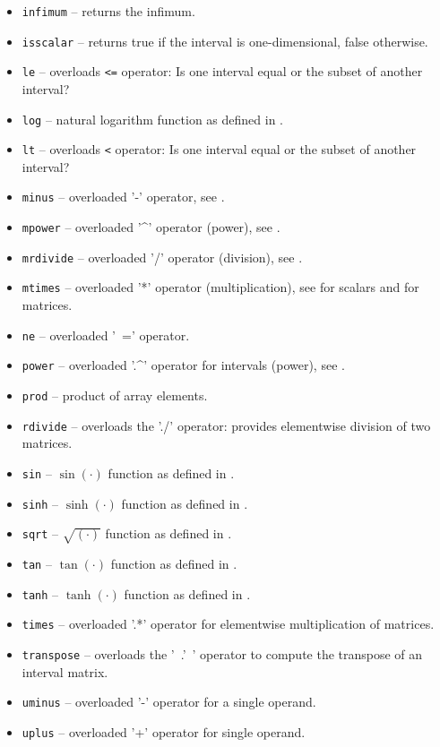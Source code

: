 \begin{itemize}
    \item \texttt{infimum} -- returns the infimum.
    \item \texttt{isscalar} -- returns true if the interval is one-dimensional, false otherwise.
    \item \texttt{le} -- overloads \texttt{<=} operator: Is one interval equal or the subset of another interval?
    \item \texttt{log} -- natural logarithm function as defined in \cite[Eq.~(5)]{Althoff2016a}.
    \item \texttt{lt} -- overloads \texttt{<} operator: Is one interval equal or the subset of another interval?
    \item \texttt{minus} -- overloaded '-' operator, see \cite[Eq.~(2)]{Althoff2016a}.
    \item \texttt{mpower} -- overloaded '\string^' operator (power), see \cite[Eq.~(9)]{Althoff2016a}.
    \item \texttt{mrdivide} -- overloaded '/' operator (division), see \cite[Eq.~(3)]{Althoff2016a}.
    \item \texttt{mtimes} -- overloaded '*' operator (multiplication), see \cite[Eq.~(2)]{Althoff2016a} for scalars and \cite[Eq.~(16)]{Althoff2016a} for matrices.
    \item \texttt{ne} -- overloaded '~=' operator.
    \item \texttt{power} -- overloaded '.\string^' operator for intervals (power), see \cite[Eq.~(9)]{Althoff2016a}.
    \item \texttt{prod} -- product of array elements.
    \item \texttt{rdivide} -- overloads the './' operator: provides elementwise division of two matrices.
    \item \texttt{sin} -- $\sin(\cdot)$ function as defined in \cite[Eq.~(12)]{Althoff2016a}.
    \item \texttt{sinh} -- $\sinh(\cdot)$ function as defined in \cite[Eq.~(7)]{Althoff2016a}.
    \item \texttt{sqrt} -- $\sqrt{(\cdot)}$ function as defined in \cite[Eq.~(5)]{Althoff2016a}.
    \item \texttt{tan} -- $\tan(\cdot)$ function as defined in \cite[Eq.~(14)]{Althoff2016a}.
    \item \texttt{tanh} -- $\tanh(\cdot)$ function as defined in \cite[Eq.~(7)]{Althoff2016a}.
    \item \texttt{times} -- overloaded '.*' operator for elementwise multiplication of matrices.
    \item \texttt{transpose} -- overloads the '\, .' \,' operator to compute the transpose of an interval matrix.
    \item \texttt{uminus} -- overloaded '-' operator for a single operand.
    \item \texttt{uplus} -- overloaded '+' operator for single operand.
\end{itemize}

